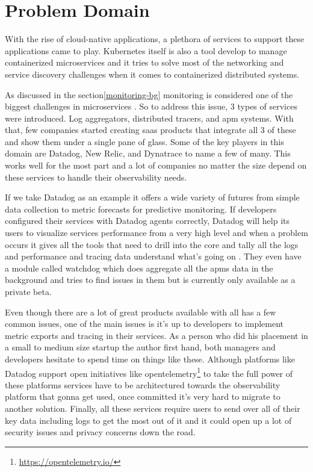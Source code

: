 \section{Problem Domain}

With the rise of cloud-native applications, \citep{CloudAdo16:online} a plethora of services to support these applications came to play. Kubernetes itself is also a tool develop to manage containerized microservices and it tries to solve most of the networking and service discovery challenges when it comes to containerized distributed systems.

As discussed in the section\ref{monitoring-bg} monitoring is considered one of the biggest challenges in microservices \citep{Understa56:online}. So to address this issue, 3 types of services were introduced. Log aggregators, distributed tracers, and \ac{apm} systems. With that, few companies started creating \ac{saas} products that integrate all 3 of these and show them under a single pane of glass. Some of the key players in this domain are Datadog, New Relic, and Dynatrace to name a few of many. This works well for the most part and a lot of companies no matter the size depend on these services to handle their observability needs.

If we take Datadog as an example it offers a wide variety of futures from simple data collection to metric forecasts for predictive monitoring. If developers configured their services with Datadog agents correctly, Datadog will help its users to visualize services performance from a very high level and when a problem occurs it gives all the tools that need to drill into the core and tally all the logs and performance and tracing data understand what's going on \citep{Datadog18:online}. They even have a module called watchdog which does aggregate all the \acp{apm} data in the background and tries to find issues in them but is currently only available as a private beta.

Even though there are a lot of great products available with all has a few common issues, one of the main issues is it's up to developers to implement metric exports and tracing in their services. As a person who did his placement in a small to medium size startup the author first hand, both managers and developers hesitate to spend time on things like these. Although platforms like Datadog support open initiatives like opentelemetry\footnote{\url{https://opentelemetry.io/}} to take the full power of these platforms services have to be architectured towards the observability platform that gonna get used, once committed it's very hard to migrate to another solution. Finally, all these services require users to send over all of their key data including logs to get the most out of it and it could open up a lot of security issues and privacy concerns down the road.

